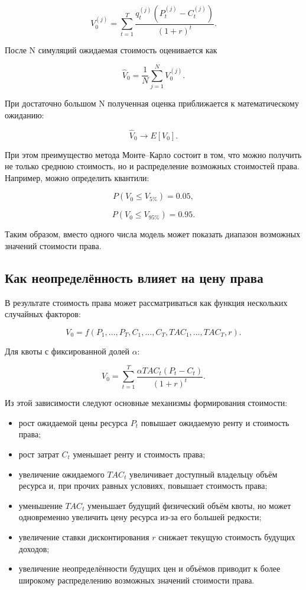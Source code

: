 \documentclass[12pt]{article}
\begin{document}
\[
V_0^{(j)} = \sum_{t=1}^{T}
\frac{
q_t^{(j)}
\left(P_t^{(j)}-C_t^{(j)}\right)
}
{(1+r)^t}.
\]

После N симуляций ожидаемая стоимость оценивается как

\[
\boxed{
\hat{V}_0 = \frac{1}{N}
\sum_{j=1}^{N}
V_0^{(j)}
}.
\]

При достаточно большом N полученная оценка приближается к математическому ожиданию:

\[
\hat{V}_0\rightarrow E[V_0].
\]

При этом преимущество метода Монте--Карло состоит в том, что можно получить не только среднюю стоимость, но и распределение возможных стоимостей права. Например, можно определить квантили:

\[
P(V_0\leq V_{5\%})=0.05,
\]

\[
P(V_0\leq V_{95\%})=0.95.
\]

Таким образом, вместо одного числа модель может показать диапазон возможных значений стоимости права.

\subsection{Как неопределённость влияет на цену права}

В результате стоимость права может рассматриваться как функция нескольких случайных факторов:

\[
V_0=
f(P_1,\ldots,P_T,
C_1,\ldots,C_T,
TAC_1,\ldots,TAC_T,r).
\]

Для квоты с фиксированной долей $\alpha$:

\[
\boxed{
V_0=
\sum_{t=1}^{T}
\frac{
\alpha TAC_t(P_t-C_t)
}
{(1+r)^t}
}.
\]

Из этой зависимости следуют основные механизмы формирования стоимости:

\begin{itemize}
\item рост ожидаемой цены ресурса $P_t$ повышает ожидаемую ренту и стоимость права;
\item рост затрат $C_t$ уменьшает ренту и стоимость права;
\item увеличение ожидаемого $TAC_t$ увеличивает доступный владельцу объём ресурса и, при прочих равных условиях, повышает стоимость права;
\item уменьшение $TAC_t$ уменьшает будущий физический объём квоты, но может одновременно увеличить цену ресурса из-за его большей редкости;
\item увеличение ставки дисконтирования $r$ снижает текущую стоимость будущих доходов;
\item увеличение неопределённости будущих цен и объёмов приводит к более широкому распределению возможных значений стоимости права.
\end{itemize}
\end{document}
